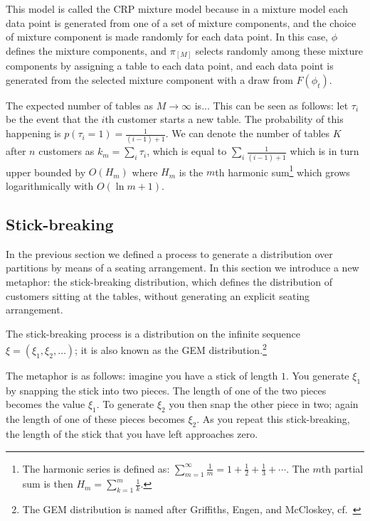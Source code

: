 This model is called the CRP mixture model because in a mixture model each data point is generated from one of a set of mixture components, and the choice of mixture component is made randomly for each data point. In this case, $\phi$ defines the mixture components, and $\pi_{[M]}$ selects randomly among these mixture components by assigning a table to each data point, and each data point is generated from the selected mixture component with a draw from $F(\phi_t)$.

The expected number of tables as $M \rightarrow \infty$ is... This can be seen as follows: let $\tau_i$ be the event that the $i$th customer starts a new table. The probability of this happening is $p(\tau_i = 1) = \frac{1}{(i-1)+1}$. We can denote the number of tables $K$ after $n$ customers as $k_m = \sum_i \tau_i$, which is equal to $\sum_i \frac{1}{(i-1)+1}$ which is in turn upper bounded by $O(H_m)$ where $H_m$ is the $m$th harmonic sum\footnote{The harmonic series is defined as: $\sum_{m=1}^\infty \frac{1}{m} = 1 + \frac{1}{2} + \frac{1}{3} + \cdots$. The $m$th partial sum is then $H_m=\sum_{k=1}^m \frac{1}{k}$.} which grows logarithmically with $O(\ln m+1)$. %
%
%



\subsection{Stick-breaking}
In the previous section we defined a process to generate a distribution over partitions by means of a seating arrangement. In this section we introduce a new metaphor: the stick-breaking distribution, which defines the distribution of customers sitting at the tables, without generating an explicit seating arrangement.

The stick-breaking process\cite{Ishwaran2001Gibbs} is a distribution on the infinite sequence  $\xi = (\xi_1,\xi_2,\ldots)$; it is also known as the GEM distribution.\footnote{The GEM distribution is named after Griffiths, Engen, and McCloskey, cf.\ \cite{Pitman1997The}}

The metaphor is as follows: imagine you have a stick of length $1$. You generate $\xi_1$ by snapping the stick into two pieces. The length of one of the two pieces becomes the value $\xi_1$. To generate $\xi_2$ you then snap the other piece in two; again the length of one of these pieces becomes $\xi_2$. As you repeat this stick-breaking, the length of the stick that you have left approaches zero.

